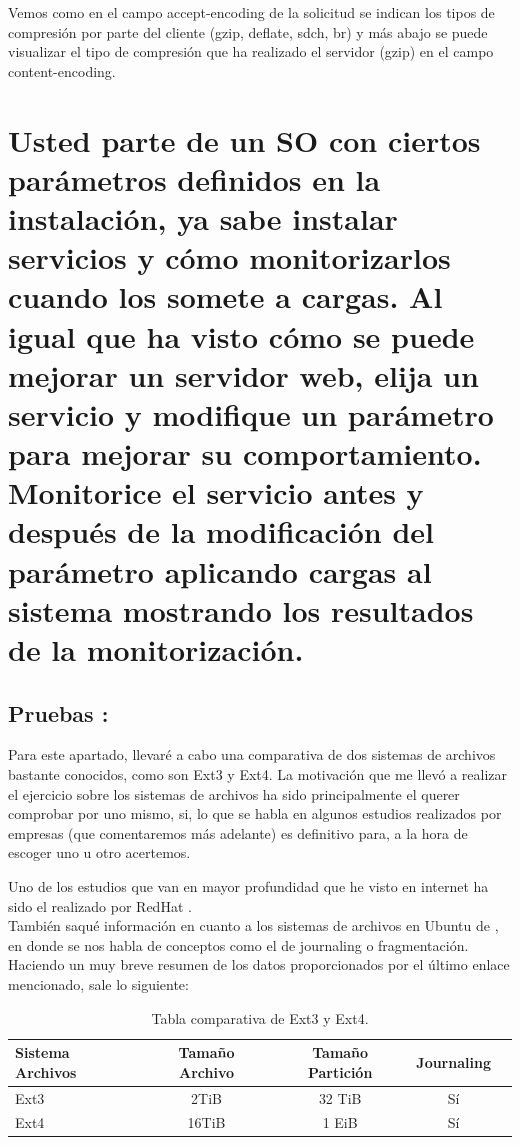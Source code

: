 Vemos como en el campo accept-encoding de la solicitud se indican los tipos de compresión por parte del cliente (gzip, deflate, sdch, br) y más abajo se puede visualizar el tipo de compresión que ha realizado el servidor (gzip) en el campo content-encoding.
\newpage
\section{Usted parte de un SO con ciertos parámetros definidos en la instalación, ya sabe instalar servicios y cómo monitorizarlos cuando los somete a cargas. Al igual que ha visto cómo se puede mejorar un servidor web, elija un servicio y modifique un parámetro para mejorar su comportamiento. Monitorice el servicio antes y después de la modificación del parámetro aplicando cargas al sistema mostrando los resultados de la monitorización.}
\subsection{Pruebas : }
Para este apartado, llevaré a cabo una comparativa de dos sistemas de archivos bastante conocidos, como son Ext3 y Ext4. La motivación que me llevó a realizar el ejercicio sobre los sistemas de archivos ha sido principalmente el querer comprobar por uno mismo, si, lo que se habla en algunos estudios realizados por empresas (que comentaremos más adelante) es definitivo para, a la hora de escoger uno u otro acertemos.

Uno de los estudios que van en mayor profundidad que he visto en internet ha sido el realizado por RedHat \cite{REDHATESTUDIO}.
\\
También saqué información en cuanto a los sistemas de archivos en Ubuntu de \cite{FILESYSTEM}, en donde se nos habla de conceptos como el de journaling o fragmentación.
\\
Haciendo un muy breve resumen de los datos proporcionados por el último enlace mencionado, sale lo siguiente:

\begin{table}[H]
\centering
\begin{tabular}{|l|c|c|c|c|}
\hline
\textbf{Sistema Archivos} & \textbf{Tamaño Archivo} & \textbf{Tamaño Partición} & \textbf{Journaling}\\
\hline
Ext3 & 2TiB & 32 TiB & Sí\\
\hline
Ext4 & 16TiB & 1 EiB & Sí\\
\hline
\end{tabular}  
\caption{Tabla comparativa de Ext3 y Ext4.} 
\label{tab:1}
\end{table}

